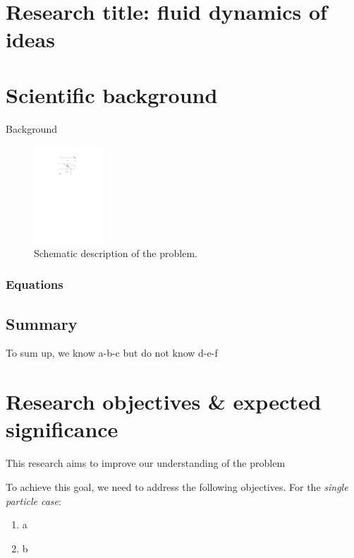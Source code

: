 \documentclass[11pt]{article}
\begin{document}

\section*{Research title: fluid dynamics of ideas  }
\setcounter{section}{0}
\setcounter{subsection}{0}

\section*{Scientific background}

Background 

\setlength{\intextsep}{0pt}%
\begin{figure}
    \includegraphics[width=0.23\textwidth]{pdf_fig2}
  \vspace{-10pt}
 \caption{Schematic description of the problem.}
\end{figure}
%

\subsubsection*{Equations }

\subsection*{Summary}

To sum up, we know a-b-c but do not know d-e-f \cite{dracos1996, Turco1983}

\section*{Research objectives \& expected significance}

This research aims to improve our understanding of the problem 

To achieve this goal, we need to address the following objectives. For the \emph{single particle case}: 
\begin{enumerate}
\item a
\item b
\end{enumerate}
\end{document}
